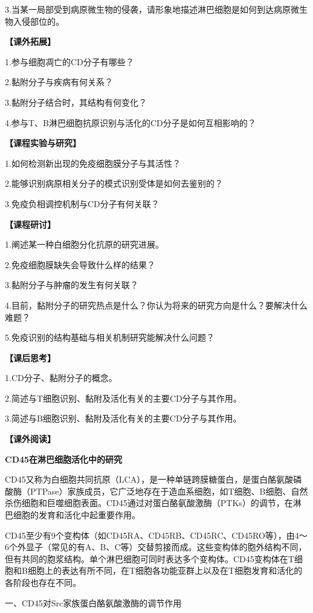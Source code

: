 3.当某一局部受到病原微生物的侵袭，请形象地描述淋巴细胞是如何到达病原微生物入侵部位的。

\noindent\textbf{【课外拓展】}

1.参与细胞凋亡的CD分子有哪些？

2.黏附分子与疾病有何关系？

3.黏附分子结合时，其结构有何变化？

4.参与T、B淋巴细胞抗原识别与活化的CD分子是如何互相影响的？

\noindent\textbf{【课程实验与研究】}

1.如何检测新出现的免疫细胞膜分子与其活性？

2.能够识别病原相关分子的模式识别受体是如何去鉴别的？

3.免疫负相调控机制与CD分子有何关联？

\noindent\textbf{【课程研讨】}

1.阐述某一种白细胞分化抗原的研究进展。

2.免疫细胞膜缺失会导致什么样的结果？

3.黏附分子与肿瘤的发生有何关联？

4.目前，黏附分子的研究热点是什么？你认为将来的研究方向是什么？要解决什么难题？

5.免疫识别的结构基础与相关机制研究能解决什么问题？

\noindent\textbf{【课后思考】}

1.CD分子、黏附分子的概念。

2.简述与T细胞识别、黏附及活化有关的主要CD分子与其作用。

3.简述与B细胞识别、黏附及活化有关的主要CD分子与其作用。

\noindent\textbf{【课外阅读】}

\begin{center}
 \textbf{\Large CD45在淋巴细胞活化中的研究}
 \end{center}

CD45又称为白细胞共同抗原（LCA），是一种单链跨膜糖蛋白，是蛋白酪氨酸磷酸酶（PTPase）家族成员，它广泛地存在于造血系细胞，如T细胞、B细胞、自然杀伤细胞和巨噬细胞表面。CD45通过对蛋白酪氨酸激酶（PTKs）的调节，在淋巴细胞的发育和活化中起重要作用。

CD45至少有9个变构体（如CD45RA、CD45RB、CD45RC、CD45RO等），由4～6个外显子（常见的有A、B、C等）交替剪接而成。这些变构体的胞外结构不同，但有共同的胞浆结构。单个淋巴细胞可同时表达多个变构体。CD45变构体在T细胞和B细胞上的表达有所不同，在T细胞各功能亚群上以及在T细胞发育和活化的各阶段也存在不同。

\begin{center}
 {\large 一、CD45对Src家族蛋白酪氨酸激酶的调节作用}
 \end{center}

